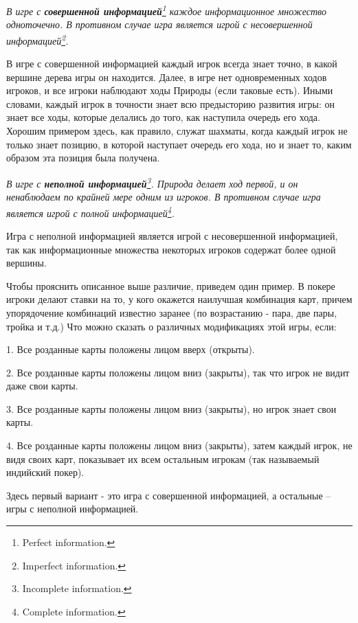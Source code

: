 \documentclass[12pt]{article}
\begin{document}
{\it В игре с {\bf совершенной информацией}\footnote{ Perfect
information.} каждое информационное множество одноточечно.  В
противном случае игра является игрой с несовершенной
информацией\footnote{ Imperfect information.}.}

В игре с совершенной информацией каждый игрок всегда знает точно,
в какой вершине дерева игры он находится. Далее, в игре нет
одновременных ходов игроков, и все игроки наблюдают ходы Природы
(если таковые есть). Иными словами, каждый игрок в точности знает
всю предысторию развития игры: он знает все ходы, которые делались
до того, как наступила очередь его хода. Хорошим примером здесь,
как правило, служат шахматы, когда каждый игрок не только знает
позицию, в которой наступает очередь его хода, но и знает то,
каким образом эта позиция была получена.

{\it В игре с {\bf неполной информацией}\footnote{ Incomplete
information.}. Природа делает ход первой, и он ненаблюдаем по
крайней мере одним из игроков. В противном случае игра является
игрой с полной информацией\footnote{ Complete information.}.}

Игра с неполной информацией является игрой с несовершенной
информацией, так как информационные множества некоторых игроков
содержат более одной вершины.

Чтобы прояснить описанное выше различие, приведем один пример. В
покере игроки делают ставки на то, у кого окажется наилучшая
комбинация карт, причем упорядочение комбинаций известно заранее (по
возрастанию - пара, две пары, тройка и т.д.) Что можно сказать о
различных модификациях этой игры, если:

1. Все розданные карты положены лицом вверх (открыты).

2. Все розданные карты положены лицом вниз (закрыты), так что игрок
не видит даже свои карты.

3. Все розданные карты положены лицом вниз (закрыты), но игрок знает
свои карты.

4. Все розданные карты положены лицом вниз (закрыты), затем каждый
игрок, не видя своих карт, показывает их всем остальным игрокам (так
называемый индийский покер).

Здесь первый вариант - это игра с совершенной информацией, а
остальные  -- игры с неполной информацией.
\end{document}
